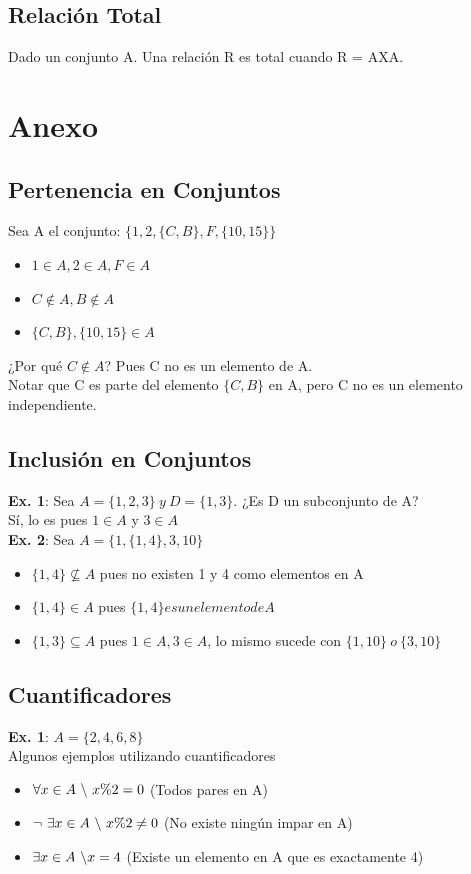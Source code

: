 \documentclass[10pt,a4paper]{article}
\begin{document}
\subsection*{Relación Total}
Dado un conjunto A. Una relación R es total cuando R = AXA.
\section*{Anexo}
\subsection*{Pertenencia en Conjuntos}
\label{subsec:pertenecencia_conjuntos}
Sea A el conjunto: $\{1, 2, \{C, B\}, F, \{10, 15\}\}$
\begin{itemize}
    \item $ 1 \in A, 2 \in A, F \in A $
    \item $ C \notin A, B \notin A $
    \item $  \{C, B\}, \{10, 15\} \in A $
\end{itemize}
¿Por qué $C \notin A$? Pues C no es un elemento de A.\\ Notar que C es parte del elemento $\{C, B\}$ en A, pero C no es un elemento independiente.
\subsection*{Inclusión en Conjuntos}
\label{subsec:inclusion_conjuntos}
\textbf{Ex. 1}: Sea $A = \{1, 2, 3\} \ y \ D = \{1, 3\}$. ¿Es D un subconjunto de A? \\
Sí, lo es pues $1 \in A$ y $ 3 \in A$ \\
\textbf{Ex. 2}: Sea $A = \{1, \{1, 4\}, 3, 10\}$
\begin{itemize}
    \item $ \{1, 4\} \nsubseteq A $ pues no existen 1 y 4 como elementos en A
    \item $ \{1, 4\} \in A $ pues $\{1, 4\} es un elemento de A$
    \item $\{1, 3\} \subseteq A$ pues $ 1 \in A, 3 \in A$, lo mismo sucede con $ \{1, 10\} \ o \ \{3, 10\}$
\end{itemize}
\subsection*{Cuantificadores}
\label{subsec:cuantificadores}
\textbf{Ex. 1}: $A = \{2, 4, 6, 8\}$ \\
Algunos ejemplos utilizando cuantificadores 
\begin{itemize}
    \item $\forall x \in A \ \symbol{92} \ x \% 2 = 0$ (Todos pares en A)
    \item $\neg \ \exists x \in A \ \symbol{92} \ x \% 2 \neq 0$ (No existe ningún impar en A) 
    \item $ \exists x \in A \ \symbol{92} x = 4$ (Existe un elemento en A que es exactamente 4)
\end{itemize}
\end{document}
